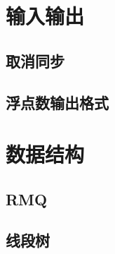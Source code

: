 \chapter{输入输出}
\section{取消同步}
\raggedbottom
\hrulefill
\section{浮点数输出格式}
\raggedbottom
\hrulefill

\chapter{数据结构}
\section{RMQ}
\raggedbottom
\hrulefill
\section{线段树}
\raggedbottom
\hrulefill

